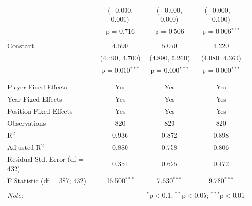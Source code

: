 \documentclass[12pt]{article}
\begin{document}
\begin{landscape}
\begin{table}[!htbp]
\begin{tabular}{@{\extracolsep{5pt}}lccc}
				& ($-$0.000, 0.000) & ($-$0.000, 0.000) & ($-$0.000, $-$0.000) \\ 
				& p = 0.716 & p = 0.506 & p = 0.006$^{***}$ \\ 
				& & & \\ 
				Constant & 4.590 & 5.070 & 4.220 \\ 
				& (4.490, 4.700) & (4.890, 5.260) & (4.080, 4.360) \\ 
				& p = 0.000$^{***}$ & p = 0.000$^{***}$ & p = 0.000$^{***}$ \\ 
				& & & \\ 
				\hline \\[-1.8ex] 
				Player Fixed Effects & Yes & Yes & Yes \\ 
				Year Fixed Effects & Yes & Yes & Yes \\ 
				Position Fixed Effects & Yes & Yes & Yes \\ 
				Observations & 820 & 820 & 820 \\ 
				R$^{2}$ & 0.936 & 0.872 & 0.898 \\ 
				Adjusted R$^{2}$ & 0.880 & 0.758 & 0.806 \\ 
				Residual Std. Error (df = 432) & 0.351 & 0.625 & 0.472 \\ 
				F Statistic (df = 387; 432) & 16.500$^{***}$ & 7.630$^{***}$ & 9.780$^{***}$ \\ 
				\hline 
				\hline \\[-1.8ex] 
				\textit{Note:}  & \multicolumn{3}{r}{$^{*}$p$<$0.1; $^{**}$p$<$0.05; $^{***}$p$<$0.01} \\ 
			\end{tabular} 
		\end{table} 
		

\end{landscape}
\end{document}
